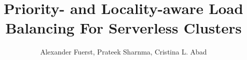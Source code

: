 \documentclass[compsoc]{IEEEtran}
\begin{document}
\date{}

\title{Priority- and Locality-aware Load Balancing For Serverless Clusters}

\author{Alexander Fuerst,
        Prateek Sharnma,
        Cristina L. Abad}
      



\maketitle
\end{document}

